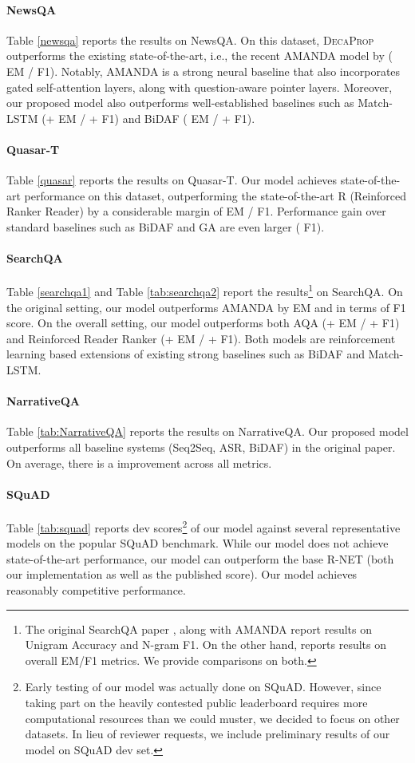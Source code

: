 \documentclass{article}
\begin{document}
\paragraph{NewsQA} Table \ref{newsqa} reports the results on NewsQA. On this dataset, \textsc{DecaProp} outperforms the existing state-of-the-art, i.e., the recent AMANDA model by ( EM /  F1). Notably, AMANDA is a strong neural baseline that also incorporates gated self-attention layers, along with question-aware pointer layers. Moreover, our proposed model also outperforms well-established baselines such as Match-LSTM (+ EM / + F1) and BiDAF ( EM / + F1).
\paragraph{Quasar-T} Table \ref{quasar} reports the results on Quasar-T. Our model achieves state-of-the-art performance on this dataset, outperforming the state-of-the-art R (Reinforced Ranker Reader) by a considerable margin of  EM /  F1. Performance gain over standard baselines such as BiDAF and GA are even larger ( F1).
 \paragraph{SearchQA} Table \ref{searchqa1}
 and Table \ref{tab:searchqa2} report the results\footnote{
 The original SearchQA paper \citep{dunn2017searchqa}, along with AMANDA \citep{kundu2018amanda} report results on Unigram Accuracy and N-gram F1. On the other hand, \citep{buck2017ask} reports results on overall EM/F1 metrics. We provide comparisons on both.} on SearchQA. On the original setting, our model outperforms AMANDA by  EM and  in terms of F1 score. On the overall setting, our model outperforms both AQA (+ EM / + F1) and Reinforced Reader Ranker (+ EM / + F1). Both models are reinforcement learning based extensions of existing strong baselines such as BiDAF and Match-LSTM.
 \paragraph{NarrativeQA} Table \ref{tab:NarrativeQA} reports the results on NarrativeQA. Our proposed model outperforms all baseline systems (Seq2Seq, ASR, BiDAF) in the original paper. On average, there is a  improvement across all metrics.
\paragraph{SQuAD} Table \ref{tab:squad} reports dev scores\footnote{Early testing of our model was actually done on SQuAD. However, since taking part on the heavily contested public leaderboard requires more computational resources than we could muster, we decided to focus on other datasets. In lieu of reviewer requests, we include preliminary results of our model on SQuAD dev set.} of our model against several representative models on the popular SQuAD benchmark. While our model does not achieve state-of-the-art performance, our model can outperform the base R-NET (both our implementation as well as the published score). Our model achieves reasonably competitive performance.
\end{document}
